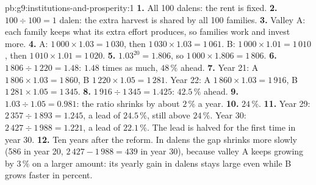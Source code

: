 \begin{solution}{pb:g9:institutions-and-prosperity:1}
\textbf{1.} All 100 dalens: the rent is fixed.
\textbf{2.} $100 \div 100 = 1$ dalen: the extra harvest is shared by all 100 families.
\textbf{3.} Valley A: each family keeps what its extra effort produces, so families work and invest more.
\textbf{4.} A: $1\,000 \times 1.03 = 1\,030$, then $1\,030 \times 1.03 = 1\,061$. B: $1\,000 \times 1.01 =
1\,010$, then $1\,010 \times 1.01 = 1\,020$.
\textbf{5.} $1.03^{20} = 1.806$, so $1\,000 \times 1.806 = 1\,806$.
\textbf{6.} $1\,806 \div 1\,220 = 1.48$: $1.48$ times as much, $48\,\%$ ahead.
\textbf{7.} Year 21: A $1\,806 \times 1.03 = 1\,860$, B $1\,220 \times 1.05 = 1\,281$. Year 22: A
$1\,860 \times 1.03 = 1\,916$, B $1\,281 \times 1.05 = 1\,345$.
\textbf{8.} $1\,916 \div 1\,345 = 1.425$: $42.5\,\%$ ahead.
\textbf{9.} $1.03 \div 1.05 = 0.981$: the ratio shrinks by about $2\,\%$ a year.
\textbf{10.} $24\,\%$.
\textbf{11.} Year 29: $2\,357 \div 1\,893 = 1.245$, a lead of $24.5\,\%$, still above $24\,\%$. Year 30:
$2\,427 \div 1\,988 = 1.221$, a lead of $22.1\,\%$. The lead is halved for the first time in year 30.
\textbf{12.} Ten years after the reform. In dalens the gap shrinks more slowly (586 in year 20, $2\,427 -
1\,988 = 439$ in year 30), because valley A keeps growing by $3\,\%$ on a larger amount: its yearly gain in
dalens stays large even while B grows faster in percent.
\end{solution}
